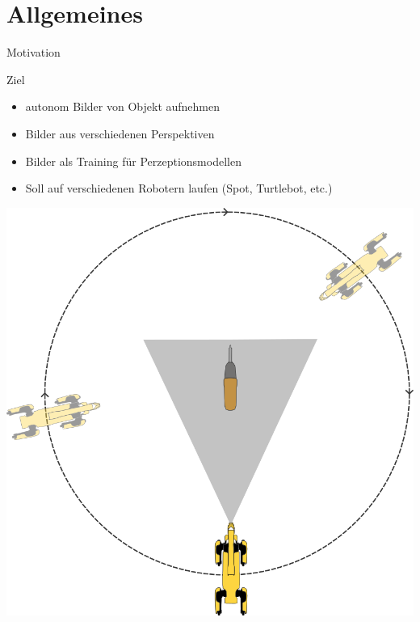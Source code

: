 \documentclass{beamer}
\begin{document}
\section{Allgemeines}
\begin{frame}{Motivation}
	\begin{minipage}{0.55 \textwidth}
		\begin{block}{Ziel}
			\begin{itemize}
				\item autonom Bilder von Objekt aufnehmen
				\item Bilder aus verschiedenen Perspektiven
				\item Bilder als Training für Perzeptionsmodellen
				\item Soll auf verschiedenen Robotern laufen (Spot, Turtlebot, etc.)
			\end{itemize}
		\end{block}
	\end{minipage}
	\hfill
	\begin{minipage}{0.4 \textwidth}
		\centering
		\includegraphics[width=1\textwidth]{Graphics/graphic_top_down.png}
	\end{minipage}
\end{frame}
\end{document}
